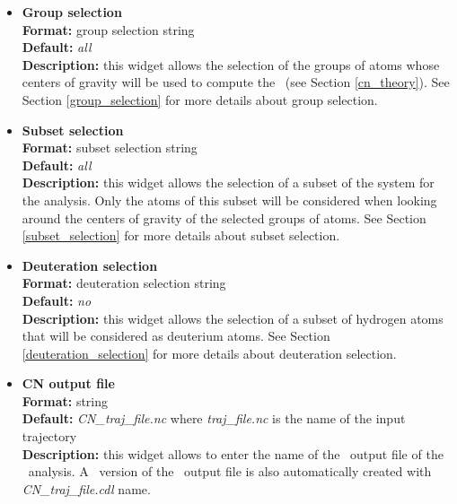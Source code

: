 \documentclass[a4paper,11pt]{report}
\newcommand{\nm}{\textit{nm}}
\begin{document}
\begin{itemize}
For example,
\begin{itemize}
\item \textit{0:10:1} will compute \PDF\ for \textit{r = 0, 1, 2, 3, 4, 5, 6, 7, 8, 9, 10} \nm .
\item \textit{3:7:1.2} will compute \PDF\ for \textit{r = 3, 4.2, 5.4, 6.6} \nm .
\end{itemize}
\newpage
\item \textbf{Group selection}\\
\textbf{Format:} group selection string\\
\textbf{Default:} \textit{all}\\
\textbf{Description:} this widget allows the selection of the groups of atoms whose centers of gravity will be used to compute 
the \CN\ (see Section \ref{cn_theory}). See Section \ref{group_selection} for more details about group selection.

\item \textbf{Subset selection}\\
\textbf{Format:} subset selection string\\
\textbf{Default:} \textit{all}\\
\textbf{Description:} this widget allows the selection of a subset of the system for the analysis. Only the atoms 
of this subset will be considered when looking around the centers of gravity of the selected groups of atoms. 
See Section \ref{subset_selection} for more details about subset selection.

\item \textbf{Deuteration selection}\\
\textbf{Format:} deuteration selection string\\
\textbf{Default:} \textit{no}\\
\textbf{Description:} this widget allows the selection of a subset of hydrogen atoms that will be considered as 
deuterium atoms. See Section \ref{deuteration_selection} for more details about deuteration selection.

\item \textbf{CN output file}\\
\textbf{Format:} string\\
\textbf{Default:} \textit{CN\_traj\_file.nc} where \textit{traj\_file.nc} is the name of the input trajectory\\
\textbf{Description:} this widget allows to enter the name of the \NetCDF\ output file of the \CN\ analysis. A \CDL\ 
version of the \NetCDF\ output file is also automatically created with \textit{CN\_traj\_file.cdl} name.
\end{itemize}
\end{document}
